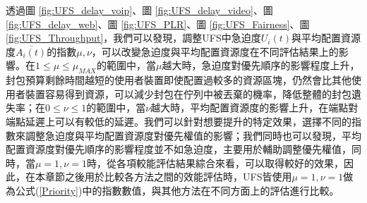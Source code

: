 透過圖 \ref{fig:UFS_delay_voip}、圖 \ref{fig:UFS_delay_video}、圖 \ref{fig:UFS_delay_web}、圖 \ref{fig:UFS_PLR}、圖 \ref{fig:UFS_Fairness}、圖 \ref{fig:UFS_Throughput}，我們可以發現，調整UFS中急迫度$U_i(t)$與平均配置資源度$\overline{A_i(t)}$的指數$\mu,\nu$，可以改變急迫度與平均配置資源度在不同評估結果上的影響。在$1 \leq \mu \leq \mu_{MAX}$的範圍中，當$\mu$越大時，急迫度對優先順序的影響程度上升，封包預算剩餘時間越短的使用者裝置即使配置過較多的資源區塊，仍然會比其他使用者裝置容易得到資源，可以減少封包在佇列中被丟棄的機率，降低整體的封包遺失率；在$0 \leq \nu \leq 1$的範圍中，當$\nu$越大時，平均配置資源度的影響上升，在端點對端點延遲上可以有較低的延遲。我們可以針對想要提升的特定效果，選擇不同的指數來調整急迫度與平均配置資源度對優先權值的影響；我們同時也可以發現，平均配置資源度對優先順序的影響程度並不如急迫度，主要用於輔助調整優先權值，同時，當$\mu=1,\nu=1$時，從各項較能評估結果綜合來看，可以取得較好的效果，因此，在本章節之後用於比較各方法之間的效能評估時，UFS皆使用$\mu=1,\nu=1$做為公式(\ref{Priority})中的指數數值，與其他方法在不同方面上的評估進行比較。

